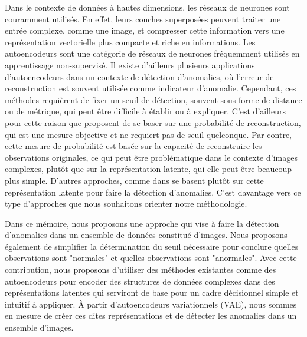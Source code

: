 Dans le contexte de données à hautes dimensions, les réseaux de neurones sont couramment utilisés. En effet, leurs couches superposées peuvent traiter une entrée complexe, comme une image, et compresser cette information vers une représentation vectorielle plus compacte et riche en informations. Les autoencodeurs sont une catégorie de réseaux de neurones fréquemment utilisés en apprentissage non-supervisé. Il existe d'ailleurs plusieurs applications d'autoencodeurs dans un contexte de détection d'anomalies, où l'erreur de reconstruction est souvent utilisée comme indicateur d'anomalie. Cependant, ces méthodes requièrent de fixer un seuil de détection, souvent sous forme de distance ou de métrique, qui peut être difficile à établir ou à expliquer. C'est d'ailleurs pour cette raison que  \cite{An2015VariationalAB} proposent de se baser sur une probabilité de reconstruction, qui est une mesure objective et ne requiert pas de seuil quelconque. Par contre, cette mesure de probabilité est basée sur la capacité de reconstruire les observations originales, ce qui peut être problématique dans le contexte d'images complexes, plutôt que sur la représentation latente, qui elle peut être beaucoup plus simple. D'autres approches, comme dans \cite{DBLP:journals/corr/abs-1802-06360} se basent plutôt sur cette représentation latente pour faire la détection d'anomalies. C'est davantage vers ce type d'approches que nous souhaitons orienter notre méthodologie. 

Dans ce mémoire, nous proposons une approche qui vise à faire la détection d'anomalies dans un ensemble de données constitué d'images. Nous proposons également de simplifier la détermination du seuil nécessaire pour conclure quelles observations sont "normales" et quelles observations sont "anormales". Avec cette contribution, nous proposons d'utiliser des méthodes existantes comme des autoencodeurs  pour encoder des structures de données complexes dans des représentations latentes qui serviront de base pour un cadre décisionnel simple et intuitif à appliquer. À partir d'autoencodeurs variationnels (VAE), nous sommes en mesure de créer ces dites représentations et de détecter les anomalies dans un ensemble d'images.